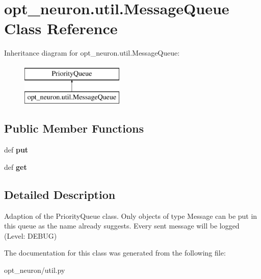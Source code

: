 \hypertarget{classopt__neuron_1_1util_1_1MessageQueue}{}\section{opt\+\_\+neuron.\+util.\+Message\+Queue Class Reference}
\label{classopt__neuron_1_1util_1_1MessageQueue}
Inheritance diagram for opt\+\_\+neuron.\+util.\+Message\+Queue\+:\begin{figure}[H]
\begin{center}
\leavevmode
\includegraphics[height=2.000000cm]{classopt__neuron_1_1util_1_1MessageQueue}
\end{center}
\end{figure}
\subsection*{Public Member Functions}
\begin{DoxyCompactItemize}
\item 
\hypertarget{classopt__neuron_1_1util_1_1MessageQueue_aefdcf179ba76aa2d5bea24b5667ed212}{}def {\bfseries put}\label{classopt__neuron_1_1util_1_1MessageQueue_aefdcf179ba76aa2d5bea24b5667ed212}

\item 
\hypertarget{classopt__neuron_1_1util_1_1MessageQueue_a8877bd018f1eb539bb70d1a4fcf59938}{}def {\bfseries get}\label{classopt__neuron_1_1util_1_1MessageQueue_a8877bd018f1eb539bb70d1a4fcf59938}

\end{DoxyCompactItemize}


\subsection{Detailed Description}
\begin{DoxyVerb}Adaption of the PriorityQueue class.
Only objects of type Message can be put in this queue as the name already suggests.
Every sent message will be logged (Level: DEBUG)
\end{DoxyVerb}
 

The documentation for this class was generated from the following file\+:\begin{DoxyCompactItemize}
\item 
opt\+\_\+neuron/util.\+py\end{DoxyCompactItemize}
